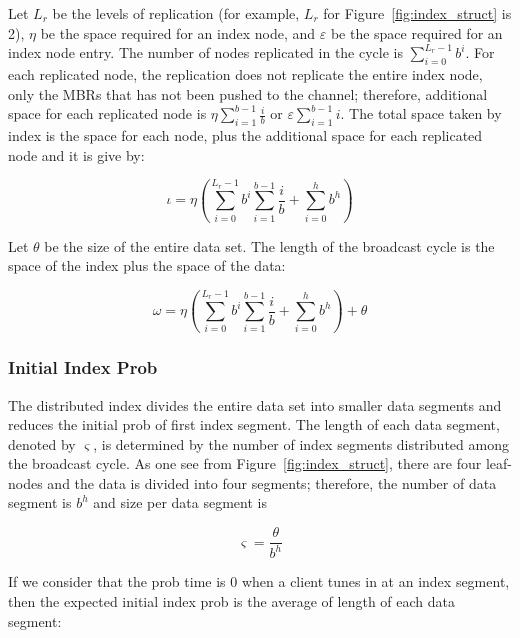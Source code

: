 \documentclass{sig-alternate}
\begin{document}
Let $L_r$ be the levels of replication (for example, $L_r$ for
Figure~\ref{fig:index_struct} is 2), $\eta$ be the space required for an
index node, and
$\varepsilon$ be the space required for an index node entry.
The number of nodes replicated in the cycle is
$\displaystyle\sum\limits_{i=0}^{L_r-1} b^i$. For each replicated node,
the replication does not replicate the entire index node, only the MBRs
that has not been pushed to the channel; therefore, additional space
for each replicated node is
$\eta\displaystyle\sum\limits_{i=1}^{b-1} \frac{i}{b}$ or
$\varepsilon\displaystyle\sum\limits_{i=1}^{b-1} i$.
The total space taken by index is the space for each node, plus the
additional space for each replicated node and it is give by:

\begin{equation}
\iota = \eta(\displaystyle\sum\limits_{i=0}^{L_r-1} b^i
\displaystyle\sum\limits_{i=1}^{b-1} \frac{i}{b} +
\displaystyle\sum\limits_{i=0}^h b^h)
\end{equation}

Let $\theta$ be the size of the entire data set. The length of the
broadcast cycle is the space of the index plus the space of the data:

\begin{equation}
\omega = \eta(\displaystyle\sum\limits_{i=0}^{L_r-1} b^i
\displaystyle\sum\limits_{i=1}^{b-1} \frac{i}{b} +
\displaystyle\sum\limits_{i=0}^h b^h) + \theta
\end{equation}

\subsubsection{Initial Index Prob}

The distributed index divides the entire data set into smaller data segments
and reduces the initial prob of first index segment. The length of each
data segment, denoted by $\varsigma$, is determined by the number of index
segments distributed among the broadcast cycle. As one see from
Figure~\ref{fig:index_struct}, there are four leaf-nodes and the data is
divided into four segments; therefore, the number of data segment is
$b^h$ and size per data segment is

\begin{equation}
\varsigma = \frac{\theta}{b^h}
\end{equation}

If we consider that the prob time is 0 when a client tunes in at an index
segment, then the expected initial index prob is the average of length of
each data segment:
\end{document}

